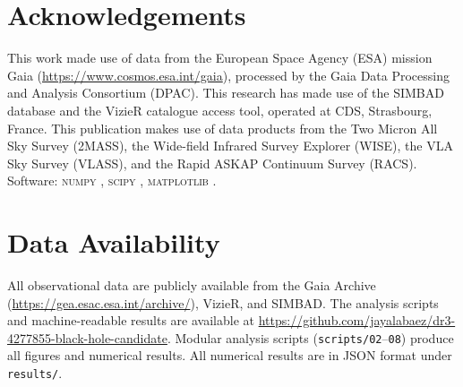 \documentclass[usenatbib,fleqn]{mnras}
\begin{document}
\section*{Acknowledgements}

This work made use of data from the European Space Agency (ESA)
mission Gaia (\url{https://www.cosmos.esa.int/gaia}), processed by
the Gaia Data Processing and Analysis Consortium (DPAC).
This research has made use of the SIMBAD database and the VizieR
catalogue access tool, operated at CDS, Strasbourg, France.
This publication makes use of data products from the Two Micron All
Sky Survey (2MASS), the Wide-field Infrared Survey Explorer
(WISE), the VLA Sky Survey (VLASS), and the Rapid ASKAP Continuum
Survey (RACS).
Software: \textsc{numpy} \citep{Harris2020},
\textsc{scipy} \citep{Virtanen2020},
\textsc{matplotlib} \citep{Hunter2007}.

\section*{Data Availability}

All observational data are publicly available from the Gaia Archive
(\url{https://gea.esac.esa.int/archive/}), VizieR, and SIMBAD.
The analysis scripts and machine-readable results are available at
\url{https://github.com/jayalabaez/dr3-4277855-black-hole-candidate}.
Modular analysis scripts (\texttt{scripts/02}--\texttt{08}) produce
all figures and numerical results.  All numerical results are in
JSON format under \texttt{results/}.




\end{document}
